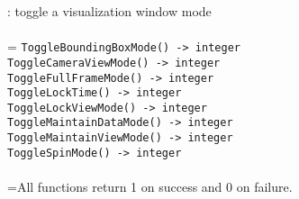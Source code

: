 \documentclass[10pt,a4paper]{report}
\begin{document}
{}
: toggle a visualization window mode\\[-3mm]

 \\ 
\hangindent=\parindent 
\verb!ToggleBoundingBoxMode() -> integer!\\ 
\verb!ToggleCameraViewMode() -> integer!\\ 
\verb!ToggleFullFrameMode() -> integer!\\ 
\verb!ToggleLockTime() -> integer!\\ 
\verb!ToggleLockViewMode() -> integer!\\ 
\verb!ToggleMaintainDataMode() -> integer!\\ 
\verb!ToggleMaintainViewMode() -> integer!\\ 
\verb!ToggleSpinMode() -> integer!\\ [-3mm]

 \\ 
\hangindent=\parindent All functions return 1 on success and 0 on failure. \\[-3mm] 
\end{document}
